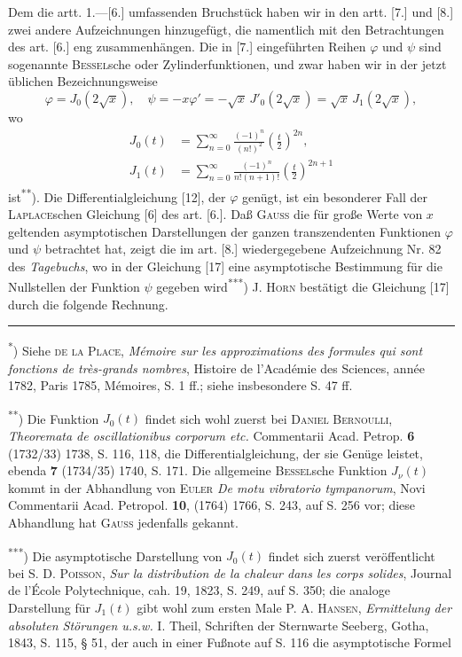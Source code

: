 \indent Dem die artt. 1.—[6.] umfassenden Bruchstück haben wir in den artt. [7.] und [8.] zwei andere Aufzeichnungen hinzugefügt, die namentlich mit den Betrachtungen des art. [6.] eng zusammenhängen. Die in [7.] eingeführten Reihen \(\varphi\) und \(\psi\) sind sogenannte \textsc{Bessel}sche oder Zylinderfunktionen, und zwar haben wir in der jetzt üblichen Bezeichnungsweise
\[
\varphi=J_0(2\sqrt{x}),\quad\psi=-x\varphi'=-\sqrt{x}\,J'_0(2\sqrt{x})=\sqrt{x}\,J_1(2\sqrt{x}),
\]
\noindent wo
\[
\begin{aligned}
J_0(t)&=\sum_{n=0}^\infty\frac{(-1)^n}{(n!)^2}\left(\frac t2\right)^{2n},\\[.5em]
J_1(t)&=\sum_{n=0}^\infty\frac{(-1)^n}{n!(n+1)!}\left(\frac t2\right)^{2n+1}
\end{aligned}
\]
\noindent ist\textsuperscript{**}). Die Differentialgleichung [12], der \(\varphi\) genügt, ist ein besonderer Fall der \textsc{Laplace}schen Gleichung [6] des art. [6.]. Daß \textsc{Gauss} die für große Werte von \(x\) geltenden asymptotischen Darstellungen der ganzen transzendenten Funktionen \(\varphi\) und \(\psi\) betrachtet hat, zeigt die im art. [8.] wiedergegebene Aufzeichnung Nr. 82 des \textit{Tagebuchs}, wo in der Gleichung [17] eine asymptotische Bestimmung für die Nullstellen der Funktion \(\psi\) gegeben wird\textsuperscript{***}) J. \textsc{Horn} bestätigt die Gleichung [17] durch die folgende Rechnung.
\par\medskip\noindent\rule{.24\linewidth}{.4pt}\par\smallskip
{\footnotesize
\noindent\hspace*{\parindent}\textsuperscript{*}) Siehe \textsc{de la Place}, \textit{Mémoire sur les approximations des formules qui sont fonctions de très-grands nombres}, Histoire de l’Académie des Sciences, année 1782, Paris 1785, Mémoires, S. 1 ff.; siehe insbesondere S. 47 ff.
\par\noindent\hspace*{\parindent}\textsuperscript{**}) Die Funktion \(J_0(t)\) findet sich wohl zuerst bei \textsc{Daniel Bernoulli}, \textit{Theoremata de oscillationibus corporum etc.} Commentarii Acad. Petrop. \textbf{6} (1732/33) 1738, S. 116, 118, die Differentialgleichung, der sie Genüge leistet, ebenda \textbf{7} (1734/35) 1740, S. 171. Die allgemeine \textsc{Bessel}sche Funktion \(J_\nu(t)\) kommt in der Abhandlung von \textsc{Euler} \textit{De motu vibratorio tympanorum}, Novi Commentarii Acad. Petropol. \textbf{10}, (1764) 1766, S. 243, auf S. 256 vor; diese Abhandlung hat \textsc{Gauss} jedenfalls gekannt.
\par\noindent\hspace*{\parindent}\textsuperscript{***}) Die asymptotische Darstellung von \(J_0(t)\) findet sich zuerst veröffentlicht bei S. D. \textsc{Poisson}, \textit{Sur la distribution de la chaleur dans les corps solides}, Journal de l’École Polytechnique, cah. 19, 1823, S. 249, auf S. 350; die analoge Darstellung für \(J_1(t)\) gibt wohl zum ersten Male P. A. \textsc{Hansen}, \textit{Ermittelung der absoluten Störungen u.s.w.} I. Theil, Schriften der Sternwarte Seeberg, Gotha, 1843, S. 115, § 51, der auch in einer Fußnote auf S. 116 die asymptotische Formel
\par}
